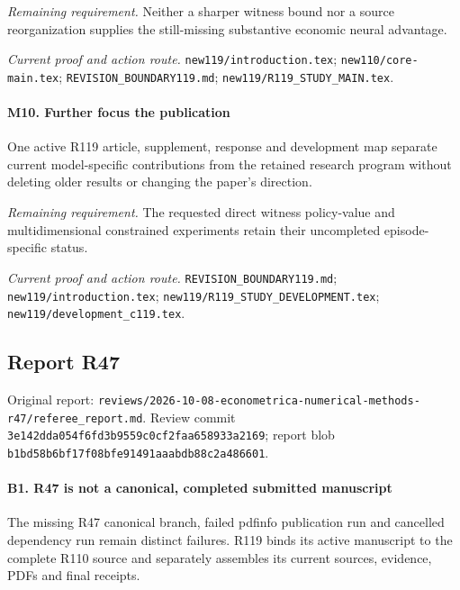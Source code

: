 \par\emph{Remaining requirement.} Neither a sharper witness bound nor a source reorganization supplies the still-missing substantive economic neural advantage.

\par\emph{Current proof and action route.} \nolinkurl{new119/introduction.tex}; \nolinkurl{new110/core-main.tex}; \nolinkurl{REVISION_BOUNDARY119.md}; \nolinkurl{new119/R119_STUDY_MAIN.tex}.

\paragraph{M10. Further focus the publication}

One active R119 article, supplement, response and development map separate current model-specific contributions from the retained research program without deleting older results or changing the paper's direction.

\par\emph{Remaining requirement.} The requested direct witness policy-value and multidimensional constrained experiments retain their uncompleted episode-specific status.

\par\emph{Current proof and action route.} \nolinkurl{REVISION_BOUNDARY119.md}; \nolinkurl{new119/introduction.tex}; \nolinkurl{new119/R119_STUDY_DEVELOPMENT.tex}; \nolinkurl{new119/development_c119.tex}.

\subsection{Report R47}

Original report: \nolinkurl{reviews/2026-10-08-econometrica-numerical-methods-r47/referee_report.md}. Review commit \nolinkurl{3e142dda054f6fd3b9559c0cf2faa658933a2169}; report blob \nolinkurl{b1bd58b6bf17f08bfe91491aaabdb88c2a486601}.

\paragraph{B1. R47 is not a canonical, completed submitted manuscript}

The missing R47 canonical branch, failed pdfinfo publication run and cancelled dependency run remain distinct failures. R119 binds its active manuscript to the complete R110 source and separately assembles its current sources, evidence, PDFs and final receipts.


